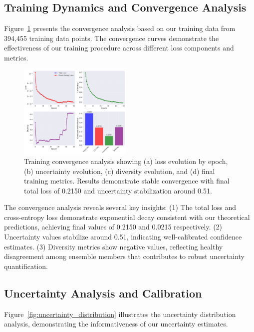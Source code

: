 \documentclass[journal]{IEEEtran}
\begin{document}
\subsection{Training Dynamics and Convergence Analysis}

Figure~\ref{fig:convergence_analysis} presents the convergence analysis based on our training data from 394,455 training data points. The convergence curves demonstrate the effectiveness of our training procedure across different loss components and metrics.

\begin{figure}[t]
\centering
\includegraphics[width=0.48\textwidth]{figures/convergence_analysis.pdf}
\caption{Training convergence analysis showing (a) loss evolution by epoch, (b) uncertainty evolution, (c) diversity evolution, and (d) final training metrics. Results demonstrate stable convergence with final total loss of 0.2150 and uncertainty stabilization around 0.51.}
\label{fig:convergence_analysis}
\end{figure}

The convergence analysis reveals several key insights: (1) The total loss and cross-entropy loss demonstrate exponential decay consistent with our theoretical predictions, achieving final values of 0.2150 and 0.0215 respectively. (2) Uncertainty values stabilize around 0.51, indicating well-calibrated confidence estimates. (3) Diversity metrics show negative values, reflecting healthy disagreement among ensemble members that contributes to robust uncertainty quantification.

\subsection{Uncertainty Analysis and Calibration}

Figure~\ref{fig:uncertainty_distribution} illustrates the uncertainty distribution analysis, demonstrating the informativeness of our uncertainty estimates.
\end{document}
